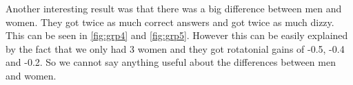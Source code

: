 Another interesting result was that there was a big difference between men and women. 
They got twice as much correct answers and got twice as much dizzy.
This can be seen in \ref{fig:grp4} and \ref{fig:grp5}. 
However this can be easily explained by the fact that we only had 3 women and they got rotatonial gains of -0.5, -0.4 and -0.2. 
So we cannot say anything useful about the differences between men and women. 
